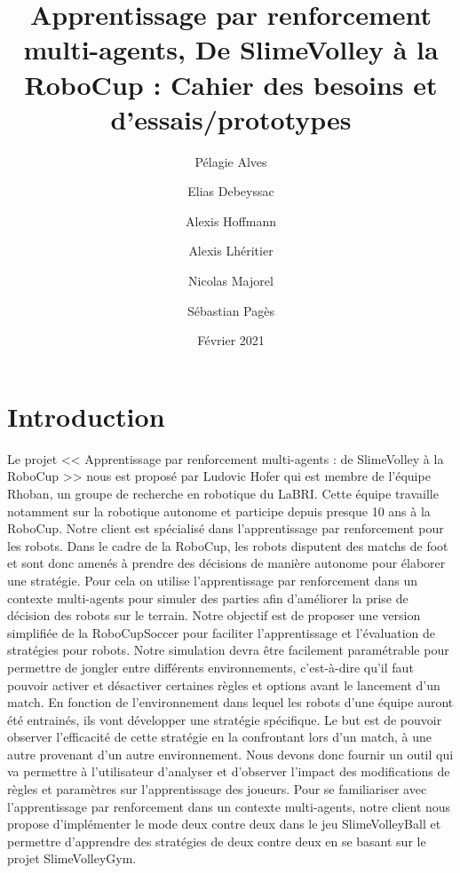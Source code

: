 \documentclass[11pt, a4paper]{article}
\title{Apprentissage par renforcement multi-agents, De SlimeVolley à la RoboCup : Cahier des besoins et d'essais/prototypes}
\author{Pélagie Alves\and Elias Debeyssac\and Alexis Hoffmann\and
Alexis Lhéritier\and Nicolas Majorel\and Sébastian Pagès}
\date{Février 2021}
\begin{document}
\maketitle

\newpage

\tableofcontents

\newpage

\section{Introduction}
Le projet << Apprentissage par renforcement multi-agents : de SlimeVolley à la RoboCup >> nous est proposé par Ludovic Hofer qui est membre de l’équipe Rhoban, un groupe de recherche en robotique du LaBRI. Cette équipe travaille notamment sur la robotique autonome et participe depuis presque 10 ans à la RoboCup. Notre client est spécialisé dans l’apprentissage par renforcement pour les robots.
\newline \newline
Dans le cadre de la RoboCup, les robots disputent des matchs de foot et sont donc amenés à prendre des décisions de manière autonome pour élaborer une stratégie. Pour cela on utilise l’apprentissage par renforcement dans un contexte multi-agents pour simuler des parties afin d'améliorer la prise de décision des robots sur le terrain.
\newline \newline
Notre objectif est de proposer une version simplifiée de la RoboCupSoccer pour faciliter l’apprentissage et l'évaluation de stratégies pour robots. Notre simulation devra être facilement paramétrable pour permettre de jongler entre différents environnements, c'est-à-dire qu'il faut pouvoir activer et désactiver certaines règles et options avant le lancement d'un match. 
En fonction de l'environnement dans lequel les robots d'une équipe auront été entrainés, ils vont développer une stratégie spécifique. Le but est de pouvoir observer l'efficacité de cette stratégie en la confrontant lors d'un match, à une autre provenant d'un autre environnement. Nous devons donc fournir un outil qui va permettre à l'utilisateur d'analyser et d'observer l'impact des modifications de règles et paramètres sur l'apprentissage des joueurs.
\newline \newline
Pour se familiariser avec l’apprentissage par renforcement dans un contexte multi-agents, notre client nous propose d’implémenter le mode deux contre deux dans le jeu SlimeVolleyBall et permettre d’apprendre des stratégies de deux contre deux en se basant sur le projet SlimeVolleyGym.
\newpage
\end{document}
